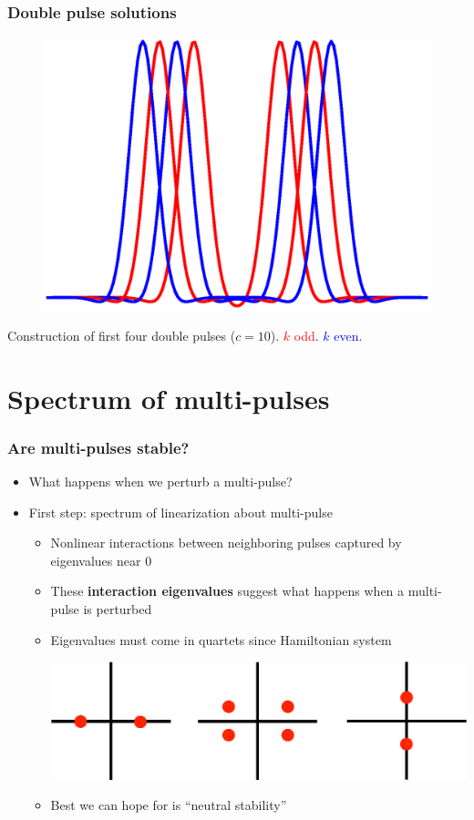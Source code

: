 \documentclass[16pt]{beamer}
\begin{document}
\begin{frame}
	\frametitle{Double pulse solutions}
	\begin{figure}
	\begin{center}
	\includegraphics[width=0.7\linewidth]{images/first4dp}
	\end{center}
	\end{figure}
	Construction of first four double pulses ($c = 10$). \textcolor{red}{$k$ odd}. \textcolor{blue}{$k$ even}.
\end{frame}

\section{Spectrum of multi-pulses}

\begin{frame}
	\frametitle{Are multi-pulses stable?}
	\begin{itemize}
	\item What happens when we perturb a multi-pulse?
	\vspace{0.25cm}
	\item First step: spectrum of linearization about multi-pulse
	\begin{itemize}
		\item Nonlinear interactions between neighboring pulses captured by eigenvalues near 0
		\vspace{0.25cm}
		\item These \textbf{interaction eigenvalues} suggest what happens when a multi-pulse is perturbed
		\vspace{0.25cm}
		\item Eigenvalues must come in quartets since Hamiltonian system
			\begin{center}
				\includegraphics[width=0.6\linewidth]{images/eigdouble2}
			\end{center}
		\vspace{0.25cm}
		\item Best we can hope for is ``neutral stability''
	\end{itemize}
	\end{itemize}
\end{frame}
\end{document}
